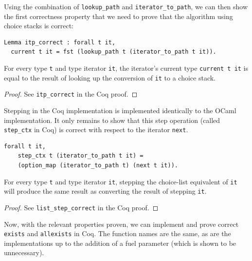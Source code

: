 \documentclass[a4paper,english]{lipics-v2019}
\begin{document}
Using the combination of \verb|lookup_path| and \verb|iterator_to_path|, we
can then show the first correctness property that we need to prove that the
algorithm using choice stacks is correct:

\begin{lemma}
\begin{small}\begin{verbatim}
Lemma itp_correct : forall t it, 
  current t it = fst (lookup_path t (iterator_to_path t it)).
\end{verbatim}\end{small}

For every type \verb|t| and type iterator \verb|it|, the iterator's current type \verb|current t it| is equal
to the result of looking up the conversion of \verb|it| to a choice stack.
\end{lemma}
\begin{proof}
See \verb|itp_correct| in the Coq proof.
\end{proof}

Stepping in the Coq implementation is implemented identically to the OCaml
implementation. It only remains to show that this step operation (called
\verb|step_ctx| in Coq) is correct with respect to the iterator
\verb|next|.

\begin{lemma}
\begin{small}\begin{verbatim}
forall t it,
    step_ctx t (iterator_to_path t it) =
    (option_map (iterator_to_path t) (next t it)).
\end{verbatim}\end{small}
For every type \verb|t| and type iterator \verb|it|,
stepping the choice-list equivalent of \verb|it| will
produce the same result as converting the result of stepping
\verb|it|.
\end{lemma}
\begin{proof}
See \verb|list_step_correct| in the Coq proof.
\end{proof}

Now, with the relevant properties proven, we can implement and prove correct
\verb|exists| and \verb|allexists| in Coq. The function names are the
same, as are the implementations up to the addition of a fuel parameter (which
is shown to be unnecessary). 
\end{document}
